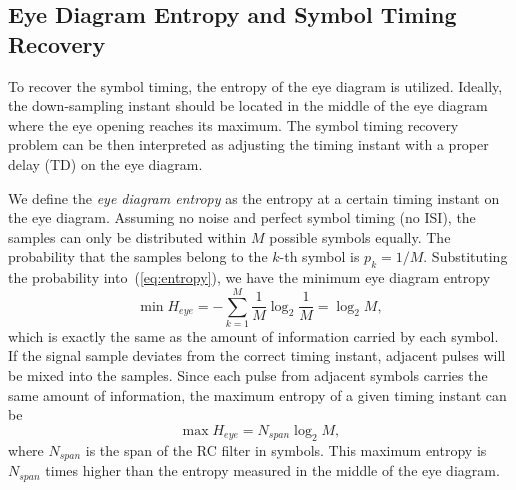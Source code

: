 \documentclass[journal,comsoc,onecolumn, 12pt,draftclsnofoot]{IEEEtran}
\begin{document}
\subsection{Eye Diagram Entropy and Symbol Timing Recovery}
\label{sec:eye_entp}
To recover the symbol timing, the entropy of the eye diagram is utilized. 
Ideally, the down-sampling instant should be located in the middle of the eye diagram where the eye opening reaches its maximum.
The symbol timing recovery problem can be then interpreted as adjusting the timing instant with a proper delay (TD) on the eye diagram.

We define the \textit{eye diagram entropy} as the entropy at a certain timing instant on the eye diagram.
Assuming no noise and perfect symbol timing (no ISI),
the samples can only be distributed within \(M\) possible symbols equally.
The probability that the samples belong to the $k$-th symbol is \(p_k=1/M\).
Substituting the probability into~(\ref{eq:entropy}), we have the minimum eye diagram entropy
\begin{equation}
\min{H_{eye}} =  - \sum\limits_{k = 1}^M {{\frac{1}{M}}\log_2 {\frac{1}{M}}}=\log_2 {M},
\label{eq:entropy_mid}
\end{equation}
which is exactly the same as the amount of information carried by each symbol.
If the signal sample deviates from the correct timing instant, adjacent pulses will be mixed into the samples.
Since each pulse from adjacent symbols carries the same amount of information, the maximum entropy of a given timing instant can be
\begin{equation}
\max{H_{eye}} =  N_{span}\log_2 {M},
\label{eq:entropy_neb}
\end{equation}
where \(N_{span}\) is the span of the RC filter in symbols.
This maximum entropy is \(N_{span}\) times higher than the entropy measured in the middle of the eye diagram.
\end{document}
